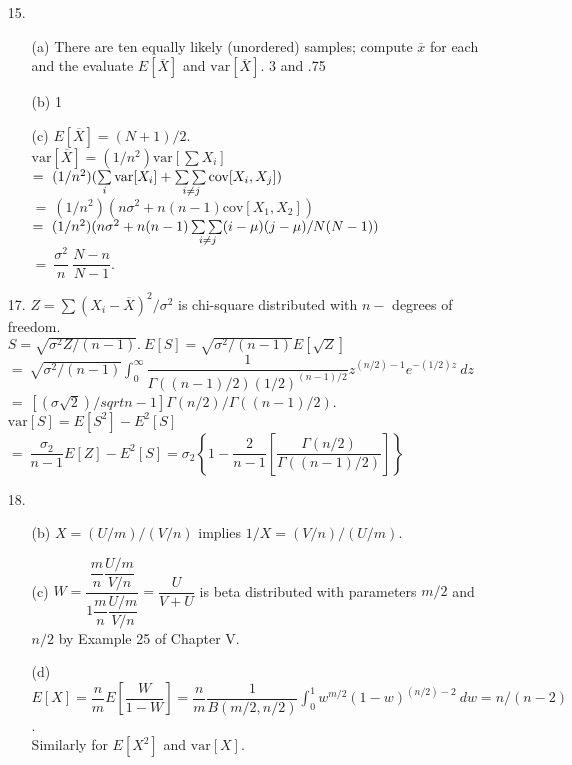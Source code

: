 \begin{enumerate}
	\item[15.]  \begin{enumerate}
		\item[(a)] There are ten equally likely (unordered) samples; compute $\overline{x}$ for each and the evaluate $E[\overline{X}]$ and $\mbox{var}[\overline{X}].$ 3 and .75
		\item[(b)] 1
		\item[(c)] $E[\overline{X}] = (N+1)/2$. \\
			$\mbox{var}[\overline{X}] = (1/n^2)\mbox{var}[\sum X_i]$ \\
			$=\ (1/n^2)(\sum\limits_i\mbox{var}[X_i] + \sum\sum\limits_{\hspace{-.15in}{i\ne j}}\mbox{cov}[X_i, X_j])$ \\
			$=\ (1/n^2)(n\sigma^2 + n(n-1)\mbox{cov}[X_1,X_2])$ \\
			$=\ (1/n^2)(n\sigma^2 + n(n-1)\sum\sum\limits_{\hspace{-.15in}{i\ne j}}(i-\mu)(j-\mu)/N(N-1))$ \\
			$=\ \dfrac{\sigma^2}{n}\ \dfrac{N-n}{N-1}$.
	\end{enumerate}

	\item[17.] $Z=\sum(X_i-\overline{X})^2/\sigma^2$ is chi-square distributed with $n-$ degrees of freedom. \\
	$S = \sqrt{\sigma^2Z/(n-1)}.\ E[S] = \sqrt{\sigma^2/(n-1)}E[\sqrt{Z}]$ \\
	$=\ \sqrt{\sigma^2/(n-1)}\displaystyle\int_0^\infty \dfrac{1}{\Gamma((n-1)/2)(1/2)^{(n-1)/2}}z^{(n/2)-1}e^{-(1/2)z}\ dz$ \\
	$=\ [(\sigma\sqrt{2})/sqrt{n-1}]\Gamma(n/2)/\Gamma((n-1)/2)$. \\
	$\mbox{var}[S]=E[S^2]-E^2[S]$ \\
	$=\ \dfrac{\sigma_2}{n-1}E[Z] - E^2[S] = \sigma_2\left\{1-\dfrac{2}{n-1}\left[\dfrac{\Gamma(n/2)}{\Gamma((n-1)/2)}\right]\right\}$

	\item[18.]  \begin{enumerate}
		\item[(b)] $X = (U/m)/(V/n)$ implies $1/X = (V/n)/(U/m)$.
		\item[(c)] $W = \dfrac{\dfrac{m}{n}\dfrac{U/m}{V/n}}{1\dfrac{m}{n}\dfrac{U/m}{V/n}} = \dfrac{U}{V+U}$ is beta distributed with parameters $m/2$ and $n/2$ by Example 25 of Chapter V.
		\item[(d)] $E[X] = \dfrac{n}{m}E[\dfrac{W}{1-W}] = \dfrac{n}{m}\dfrac{1}{B(m/2,n/2)}\displaystyle \int_0^1 w^{m/2}(1-w)^{(n/2)-2}\ dw = n/(n-2)$. \\
		Similarly for $E[X^2]$ and $\mbox{var}[X]$.
	\end{enumerate}


\end{enumerate}
